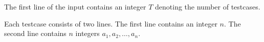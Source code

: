 The first line of the input contains an integer $T$ denoting the number of testcases. 

Each testcase consists of two lines.
The first line contains an integer $n$.
The second line contains $n$ integers $a_1,a_2,\ldots,a_n$.